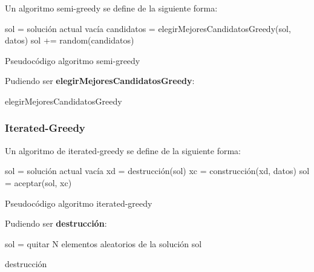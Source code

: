 \documentclass[13pt,a4paper]{article}
\begin{document}
Un algoritmo semi-greedy se define de la siguiente forma:

\begin{algorithm}[H]
    \SetAlgoLined
        sol = solución actual vacía \;
         {
            candidatos = elegirMejoresCandidatosGreedy(sol, datos) \;
            sol += random(candidatos) \;
        }        
    \caption{Pseudocódigo algoritmo semi-greedy}
\end{algorithm}

\vspace{\baselineskip}

Pudiendo ser \textbf{elegirMejoresCandidatosGreedy}:

\begin{algorithm}[H]
    \SetAlgoLined
    \caption{elegirMejoresCandidatosGreedy}
\end{algorithm}


\subsubsection{Iterated-Greedy}

Un algoritmo de iterated-greedy se define de la siguiente forma:

\begin{algorithm}[H]
    \SetAlgoLined
        sol = solución actual vacía \;
         {
            xd = destrucción(sol) \;
            xc = construcción(xd, datos) \;
            sol = aceptar(sol, xc) \;
        }        
    \caption{Pseudocódigo algoritmo iterated-greedy}
\end{algorithm}

\vspace{\baselineskip}

Pudiendo ser \textbf{destrucción}:

\begin{algorithm}[H]
    \SetAlgoLined
        sol = quitar N elementos aleatorios de la solución sol
    \caption{destrucción}
\end{algorithm}

\vspace{\baselineskip}
\end{document}

